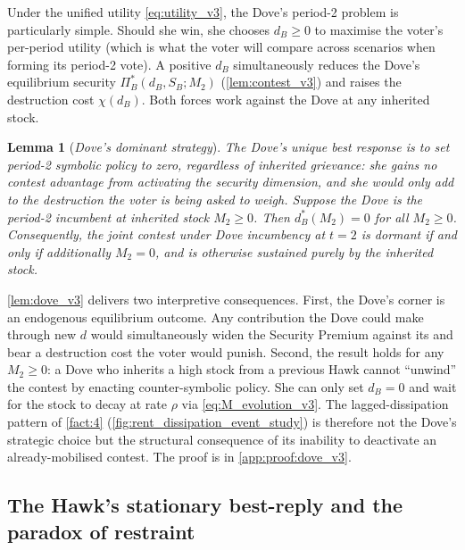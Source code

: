 \documentclass[11pt,twoside]{extarticle}
\newtheorem{lemma}{Lemma}
\begin{document}
Under the unified utility \autoref{eq:utility_v3}, the Dove's period-2 problem is particularly simple. Should she win, she chooses $d_B\ge 0$ to maximise the voter's per-period utility (which is what the voter will compare across scenarios when forming its period-2 vote). A positive $d_B$ simultaneously reduces the Dove's equilibrium security $\Pi_B^*(d_B,S_B;M_2)$ (\autoref{lem:contest_v3}) and raises the destruction cost $\chi(d_B)$. Both forces work against the Dove at any inherited stock.

\begin{lemma}[\emph{Dove's dominant strategy}]\label{lem:dove_v3}
\emph{The Dove's unique best response is to set period-2 symbolic policy to zero, regardless of inherited grievance: she gains no contest advantage from activating the security dimension, and she would only add to the destruction the voter is being asked to weigh.}
Suppose the Dove is the period-2 incumbent at inherited stock $M_2\ge 0$. Then $d_B^*(M_2)=0$ for all $M_2\ge 0$. Consequently, the joint contest under Dove incumbency at $t=2$ is dormant if and only if additionally $M_2=0$, and is otherwise sustained purely by the inherited stock.
\end{lemma}

\autoref{lem:dove_v3} delivers two interpretive consequences. First, the Dove's corner is an endogenous equilibrium outcome. Any contribution the Dove could make through new $d$ would simultaneously widen the Security Premium against its and bear a destruction cost the voter would punish. Second, the result holds for any $M_2\ge 0$: a Dove who inherits a high stock from a previous Hawk cannot ``unwind'' the contest by enacting counter-symbolic policy. She can only set $d_B=0$ and wait for the stock to decay at rate $\rho$ via \autoref{eq:M_evolution_v3}. The lagged-dissipation pattern of \autoref{fact:4} (\autoref{fig:rent_dissipation_event_study}) is therefore not the Dove's strategic choice but the structural consequence of its inability to deactivate an already-mobilised contest. The proof is in \autoref{app:proof:dove_v3}.

\subsection{The Hawk's stationary best-reply and the paradox of restraint}\label{subsec:hawk_t2_v3}
\end{document}
